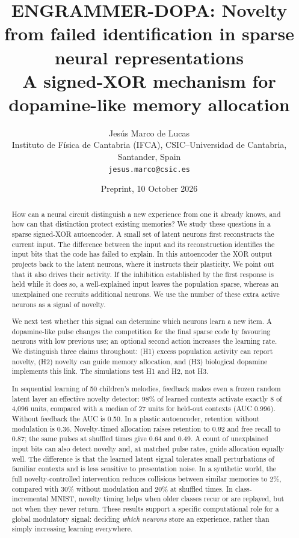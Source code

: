 \documentclass[11pt,a4paper]{article}
\title{\bfseries ENGRAMMER-DOPA: Novelty from failed identification in sparse neural representations\\[6pt]
\large\mdseries A signed-XOR mechanism for dopamine-like memory allocation}
\author{Jes\'us Marco de Lucas\\[2pt]
\small Instituto de F\'isica de Cantabria (IFCA), CSIC--Universidad de Cantabria, Santander, Spain\\
\small \texttt{jesus.marco@csic.es}}
\date{Preprint, 10 October 2026}
\begin{document}
\maketitle

\begin{abstract}
How can a neural circuit distinguish a new experience from one it already knows, and how can that distinction protect existing memories? We study these questions in a sparse signed-XOR autoencoder. A small set of latent neurons first reconstructs the current input. The difference between the input and its reconstruction identifies the input bits that the code has failed to explain. In this autoencoder the XOR output projects back to the latent neurons, where it instructs their plasticity. We point out that it also drives their activity. If the inhibition established by the first response is held while it does so, a well-explained input leaves the population sparse, whereas an unexplained one recruits additional neurons. We use the number of these extra active neurons as a signal of novelty.

We next test whether this signal can determine which neurons learn a new item. A dopamine-like pulse changes the competition for the final sparse code by favouring neurons with low previous use; an optional second action increases the learning rate. We distinguish three claims throughout: (H1) excess population activity can report novelty, (H2) novelty can guide memory allocation, and (H3) biological dopamine implements this link. The simulations test H1 and H2, not H3.

In sequential learning of 50 children's melodies, feedback makes even a frozen random latent layer an effective novelty detector: 98\% of learned contexts activate exactly 8 of 4,096 units, compared with a median of 27 units for held-out contexts (AUC 0.996). Without feedback the AUC is 0.50. In a plastic autoencoder, retention without modulation is 0.36. Novelty-timed allocation raises retention to 0.92 and free recall to 0.87; the same pulses at shuffled times give 0.64 and 0.49. A count of unexplained input bits can also detect novelty and, at matched pulse rates, guide allocation equally well. The difference is that the learned latent signal tolerates small perturbations of familiar contexts and is less sensitive to presentation noise. In a synthetic world, the full novelty-controlled intervention reduces collisions between similar memories to 2\%, compared with 30\% without modulation and 20\% at shuffled times. In class-incremental MNIST, novelty timing helps when older classes recur or are replayed, but not when they never return. These results support a specific computational role for a global modulatory signal: deciding \emph{which neurons} store an experience, rather than simply increasing learning everywhere.
\end{abstract}
\end{document}
